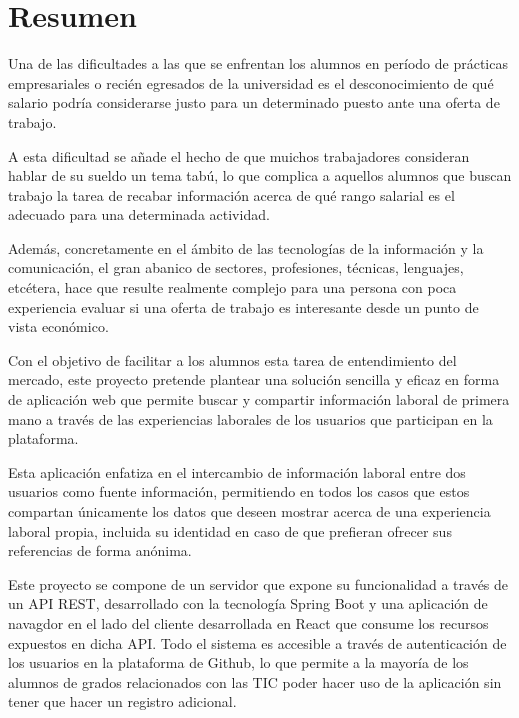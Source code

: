 \documentclass[a4paper, 12pt]{book}
\begin{document}

\chapter*{Resumen}

Una de las dificultades a las que se enfrentan los alumnos en período de prácticas empresariales o recién egresados de la universidad 
es el desconocimiento de qué salario podría considerarse justo para un determinado puesto ante una oferta de trabajo.

A esta dificultad se añade el hecho de que muichos trabajadores consideran hablar de su sueldo un tema tabú,
lo que complica a aquellos alumnos que buscan trabajo la tarea de recabar información acerca de qué rango salarial es el adecuado para una determinada actividad.

Además, concretamente en el ámbito de las tecnologías de la información y la comunicación, el gran abanico de sectores, profesiones, técnicas, lenguajes, etcétera, 
hace que resulte realmente complejo para una persona con poca experiencia evaluar si una oferta de trabajo es interesante desde un punto de vista económico.

Con el objetivo de facilitar a los alumnos esta tarea de entendimiento del mercado, este proyecto pretende plantear una solución sencilla y eficaz en forma de aplicación 
web que permite buscar y compartir información laboral de primera mano a través de las experiencias laborales de los usuarios que participan en la plataforma.

Esta aplicación enfatiza en el intercambio de información laboral entre dos usuarios como fuente información, permitiendo en todos los casos que estos compartan únicamente los datos que deseen mostrar acerca de una experiencia laboral propia, 
incluida su identidad en caso de que prefieran ofrecer sus referencias de forma anónima.

Este proyecto se compone de un servidor que expone su funcionalidad a través de un API REST, desarrollado con la tecnología Spring Boot y una aplicación de navagdor en el lado del cliente desarrollada en React que consume los recursos expuestos en dicha API. 
Todo el sistema es accesible a través de autenticación de los usuarios en la plataforma de Github, lo que permite a la mayoría de los alumnos de grados relacionados con las TIC poder hacer uso de la aplicación sin tener que hacer un registro adicional.
\end{document}
